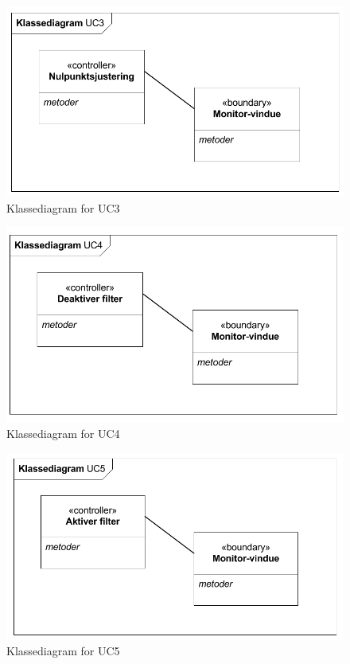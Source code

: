 \begin{figure}[H]
	\centering
	\includegraphics[width=1\textwidth]{Figurer/Snip20151104_39}
	\caption{Klassediagram for UC3}
\end{figure}

\begin{figure}[H]
	\centering
	\includegraphics[width=1\textwidth]{Figurer/Snip20151104_40}
	\caption{Klassediagram for UC4}
\end{figure}

\begin{figure}[H]
	\centering
	\includegraphics{Figurer/Snip20151104_41}
	\caption{Klassediagram for UC5}
\end{figure}

